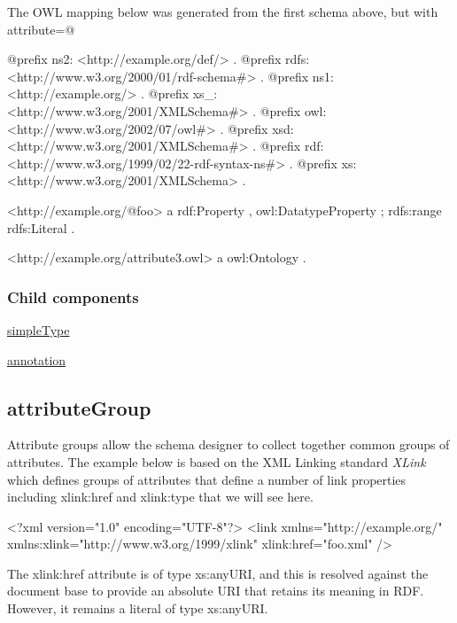 The OWL mapping below was generated from the first schema above, but with attribute=@


\begin{DoxyCodeInclude}
@prefix ns2:     <http://example.org/def/> .
@prefix rdfs:    <http://www.w3.org/2000/01/rdf-schema#> .
@prefix ns1:     <http://example.org/> .
@prefix xs_:     <http://www.w3.org/2001/XMLSchema#> .
@prefix owl:     <http://www.w3.org/2002/07/owl#> .
@prefix xsd:     <http://www.w3.org/2001/XMLSchema#> .
@prefix rdf:     <http://www.w3.org/1999/02/22-rdf-syntax-ns#> .
@prefix xs:      <http://www.w3.org/2001/XMLSchema> .

<http://example.org/@foo>
      a       rdf:Property , owl:DatatypeProperty ;
      rdfs:range rdfs:Literal .

<http://example.org/attribute3.owl>
      a       owl:Ontology .
\end{DoxyCodeInclude}
\hypertarget{attributenotation_attributeChildren}{}\subsubsection{Child components}\label{attributenotation_attributeChildren}

\begin{DoxyItemize}
\item \hyperlink{simpletype}{simpleType}
\item \hyperlink{annotation}{annotation} 
\end{DoxyItemize}\hypertarget{attributeGroup}{}\subsection{attributeGroup}\label{attributeGroup}
Attribute groups allow the schema designer to collect together common groups of attributes. The example below is based on the XML Linking standard {\itshape XLink\/} which defines groups of attributes that define a number of link properties including xlink:href and xlink:type that we will see here.


\begin{DoxyCodeInclude}
<?xml version="1.0" encoding="UTF-8"?>
<link xmlns="http://example.org/" xmlns:xlink="http://www.w3.org/1999/xlink" 
        xlink:href="foo.xml" />

\end{DoxyCodeInclude}


The xlink:href attribute is of type xs:anyURI, and this is resolved against the document base to provide an absolute URI that retains its meaning in RDF. However, it remains a literal of type xs:anyURI.


